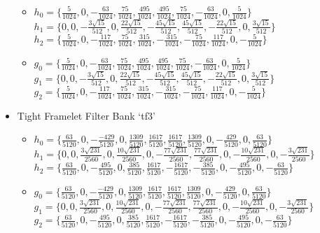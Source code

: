 \begin{itemize}
\begin{itemize}
        \item $h_0 = \{\frac{5}{1024},0,-\frac{63}{1024},\frac{75}{1024},\frac{495}{1024},\frac{495}{1024},\frac{75}{1024},-\frac{63}{1024},0,\frac{5}{1024}\}$ \\ 
        $h_1 = \{0,0,-\frac{3\sqrt{15}}{512},0,\frac{22\sqrt{15}}{512},-\frac{45\sqrt{15}}{512},\frac{45\sqrt{15}}{512},-\frac{22\sqrt{15}}{512},0,\frac{3\sqrt{15}}{512}\}$ \\
        $h_2 = \{\frac{5}{1024},0,-\frac{117}{1024},\frac{75}{1024},\frac{315}{1024},-\frac{315}{1024},-\frac{75}{1024},\frac{117}{1024},0,-\frac{5}{1024}\}$ \\ 
        \item $g_0 = \{\frac{5}{1024},0,-\frac{63}{1024},\frac{75}{1024},\frac{495}{1024},\frac{495}{1024},\frac{75}{1024},-\frac{63}{1024},0,\frac{5}{1024}\}$ \\ 
        $g_1 = \{0,0,-\frac{3\sqrt{15}}{512},0,\frac{22\sqrt{15}}{512},-\frac{45\sqrt{15}}{512},\frac{45\sqrt{15}}{512},-\frac{22\sqrt{15}}{512},0,\frac{3\sqrt{15}}{512}\}$ \\
        $g_2 = \{\frac{5}{1024},0,-\frac{117}{1024},\frac{75}{1024},\frac{315}{1024},-\frac{315}{1024},-\frac{75}{1024},\frac{117}{1024},0,-\frac{5}{1024}\}$ \\ 
    \end{itemize}
    \item Tight Framelet Filter Bank `tf3' 
    \begin{itemize}
        \item $h_0 = \{\frac{63}{5120},0,-\frac{-429}{5120},0,\frac{1309}{5120},\frac{1617}{5120},\frac{1617}{5120},\frac{1309}{5120},0,-\frac{429}{5120},0,\frac{63}{5120}\}$ \\ 
        $h_1 = \{0,0,\frac{3\sqrt{231}}{2560},0,\frac{10\sqrt{231}}{2560},0,-\frac{77\sqrt{231}}{2560},\frac{77\sqrt{231}}{2560},0,-\frac{10\sqrt{231}}{2560},0,-\frac{3\sqrt{231}}{2560}\}$ \\
        $h_2 = \{\frac{63}{5120},0,-\frac{495}{5120},0,\frac{385}{5120},\frac{1617}{5120},-\frac{1617}{5120},-\frac{385}{5120},0,-\frac{495}{5120},0,-\frac{63}{5120}\}$ \\ 
        \item $g_0 = \{\frac{63}{5120},0,-\frac{-429}{5120},0,\frac{1309}{5120},\frac{1617}{5120},\frac{1617}{5120},\frac{1309}{5120},0,-\frac{429}{5120},0,\frac{63}{5120}\}$ \\ 
        $g_1 = \{0,0,\frac{3\sqrt{231}}{2560},0,\frac{10\sqrt{231}}{2560},0,-\frac{77\sqrt{231}}{2560},\frac{77\sqrt{231}}{2560},0,-\frac{10\sqrt{231}}{2560},0,-\frac{3\sqrt{231}}{2560}\}$ \\
        $g_2 = \{\frac{63}{5120},0,-\frac{495}{5120},0,\frac{385}{5120},\frac{1617}{5120},-\frac{1617}{5120},-\frac{385}{5120},0,-\frac{495}{5120},0,-\frac{63}{5120}\}$ \\ 

    \end{itemize}
\end{itemize}

